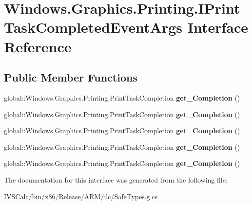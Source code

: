 \hypertarget{interface_windows_1_1_graphics_1_1_printing_1_1_i_print_task_completed_event_args}{}\section{Windows.\+Graphics.\+Printing.\+I\+Print\+Task\+Completed\+Event\+Args Interface Reference}
\label{interface_windows_1_1_graphics_1_1_printing_1_1_i_print_task_completed_event_args}
\subsection*{Public Member Functions}
\begin{DoxyCompactItemize}
\item 
\mbox{\label{interface_windows_1_1_graphics_1_1_printing_1_1_i_print_task_completed_event_args_a9d92a1e962df74ea1ae6610c5f3f02f7}} 
global\+::\+Windows.\+Graphics.\+Printing.\+Print\+Task\+Completion {\bfseries get\+\_\+\+Completion} ()
\item 
\mbox{\label{interface_windows_1_1_graphics_1_1_printing_1_1_i_print_task_completed_event_args_a9d92a1e962df74ea1ae6610c5f3f02f7}} 
global\+::\+Windows.\+Graphics.\+Printing.\+Print\+Task\+Completion {\bfseries get\+\_\+\+Completion} ()
\item 
\mbox{\label{interface_windows_1_1_graphics_1_1_printing_1_1_i_print_task_completed_event_args_a9d92a1e962df74ea1ae6610c5f3f02f7}} 
global\+::\+Windows.\+Graphics.\+Printing.\+Print\+Task\+Completion {\bfseries get\+\_\+\+Completion} ()
\item 
\mbox{\label{interface_windows_1_1_graphics_1_1_printing_1_1_i_print_task_completed_event_args_a9d92a1e962df74ea1ae6610c5f3f02f7}} 
global\+::\+Windows.\+Graphics.\+Printing.\+Print\+Task\+Completion {\bfseries get\+\_\+\+Completion} ()
\item 
\mbox{\label{interface_windows_1_1_graphics_1_1_printing_1_1_i_print_task_completed_event_args_a9d92a1e962df74ea1ae6610c5f3f02f7}} 
global\+::\+Windows.\+Graphics.\+Printing.\+Print\+Task\+Completion {\bfseries get\+\_\+\+Completion} ()
\end{DoxyCompactItemize}


The documentation for this interface was generated from the following file\+:\begin{DoxyCompactItemize}
\item 
I\+V\+S\+Calc/bin/x86/\+Release/\+A\+R\+M/ilc/Safe\+Types.\+g.\+cs\end{DoxyCompactItemize}
